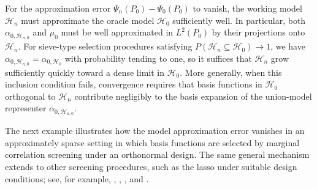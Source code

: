 \documentclass[11pt]{article}
\theoremstyle{definition}
\begin{document}
 


 
For the approximation error \(\Psi_n(P_0)-\Psi_0(P_0)\) to vanish, the working model \(\mathcal H_n\) must approximate the oracle model \(\mathcal H_0\) sufficiently well. In particular, both \(\alpha_{0,\mathcal H_{n,0}}\) and \(\mu_0\) must be well approximated in \(L^2(P_0)\) by their projections onto \(\mathcal H_n\). For sieve-type selection procedures satisfying \(P(\mathcal H_n \subseteq \mathcal H_0)\to 1\), we have \(\alpha_{0,\mathcal H_{n,0}}=\alpha_{0,\mathcal H_0}\) with probability tending to one, so it suffices that \(\mathcal H_n\) grow sufficiently quickly toward a dense limit in \(\mathcal H_0\). More generally, when this inclusion condition fails, convergence requires that basis functions in \(\mathcal H_0\) orthogonal to \(\mathcal H_n\) contribute negligibly to the basis expansion of the union-model representer \(\alpha_{0,\mathcal H_{n,0}}\).



The next example illustrates how the model approximation error vanishes in an approximately sparse setting in which basis functions are selected by marginal correlation screening under an orthonormal design. The same general mechanism extends to other screening procedures, such as the lasso under suitable design conditions; see, for example, \cite{donoho2005stable}, \cite{AdaptLassoOracle}, \cite{huang2008adaptive}, and \cite{wainwright2019high}.
\end{document}
